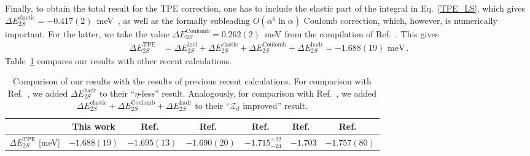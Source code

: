 \documentclass[prl,
twocolumn,
showpacs,preprintnumbers,amsmath,amssymb,
superscriptaddress,
a4paper,nofootinbib,longbibliography]{revtex4-2}
\begin{document}
Finally, to obtain the total result for the TPE correction, one has to include the elastic part of the integral in Eq.~\ref{TPE_LS}, which gives $\Delta E_{2S}^\mathrm{elastic}=-0.417(2)$~meV~\cite{Carlson:2013xea}, as well as the formally subleading $O(\alpha^6\ln \alpha)$ Coulomb correction, which, however, is numerically important. For the latter, we take the value $\Delta E_{2S}^\mathrm{Coulomb}=0.262(2)$~meV from the compilation of Ref.~\cite{Krauth:2015nja}. This gives
\begin{align}
    \Delta E_{2S}^\mathrm{TPE} & = \Delta E_{2S}^\mathrm{inel}+\Delta E_{2S}^\mathrm{elastic}+\Delta E_{2S}^\mathrm{Coulomb}+\Delta E_{2S}^\mathrm{hadr}= -1.688(19)\text{ meV}\,.
\end{align}
Table~\ref{tab:results_comparison} compares our results with other recent calculations.

\begin{table}[]
    \centering
    \begin{tabular}{c||c|c|c|c|c|c}
    &  This work
    & Ref.~\cite{Acharya:2020bxf}
    & Ref.~\cite{Hernandez:2014pwa}
    & Ref.~\cite{Hernandez:2017mof}
    & Ref.~\cite{Hernandez:2019zcm}
    & Ref.~\cite{Emmons:2020aov}
    \\
    \hline\hline
    $\Delta E_{2S}^\mathrm{TPE}$ [meV]
    & $-1.688(19)$
    & $-1.695(13)$
    & $-1.690(20)$
    & $-1.715^{+22}_{-24}$
    & $-1.703$
    & $-1.757(80)$
    \end{tabular}
    \caption{Comparison of our results with the results of previous recent calculations. For comparison with Ref.~\cite{Hernandez:2019zcm}, we added $\Delta E_{2S}^\mathrm{hadr}$ to their ``$\eta$-less'' result. Analogously, for comparison with Ref.~\cite{Emmons:2020aov}, we added $\Delta E_{2S}^\mathrm{elastic}+\Delta E_{2S}^\mathrm{Coulomb}+\Delta E_{2S}^\mathrm{hadr}$ to their ``$\mathcal{Z}_d$ improved'' result.}
    \label{tab:results_comparison}
\end{table}
\end{document}
